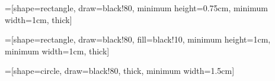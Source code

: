 \raggedbottom  %

\usepackage{graphicx}
\graphicspath{{graphics/}}


\usepackage{cancel}                       %
\usepackage{helvet}
\usepackage{booktabs}  %
\usepackage{units} %
\usepackage{amssymb}
\usepackage{amsmath} %
\usepackage{wrapfig}
\usepackage{hyperref}
\usepackage{lineno}
\usepackage{listings}

\usepackage{color}


\usepackage{pdflscape}
\usepackage{lipsum}


\usepackage{tikz}
=[shape=rectangle,
                 draw=black!80,
                 minimum height=0.75cm,
                 minimum width=1cm,
                 thick]

=[shape=rectangle,
                 draw=black!80,
                 fill=black!10,
                 minimum height=1cm,
                 minimum width=1cm,
                 thick]

=[shape=circle,
                  draw=black!80,
                  thick,
                  minimum width=1.5cm]


\usepackage[
    backend=biber,
    style=numeric,
    natbib=true,
    url=false
]{biblatex}
%
